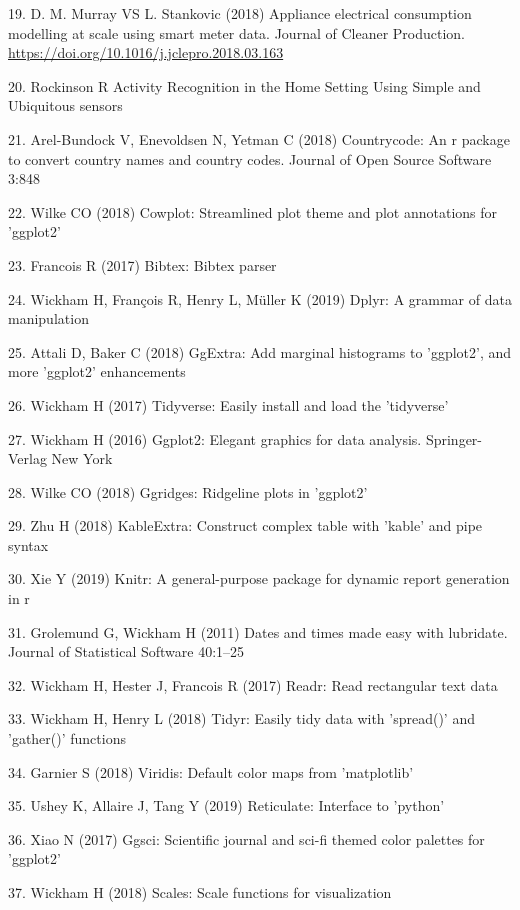 \documentclass[11pt,]{article}
\begin{document}
\leavevmode\hypertarget{ref-d.m.murrayApplianceElectricalConsumption2018}{}%
19. D. M. Murray VS L. Stankovic (2018) Appliance electrical consumption
modelling at scale using smart meter data. Journal of Cleaner
Production. \url{https://doi.org/10.1016/j.jclepro.2018.03.163}

\leavevmode\hypertarget{ref-rockinsonActivityRecognitionHome}{}%
20. Rockinson R Activity Recognition in the Home Setting Using Simple
and Ubiquitous sensors

\leavevmode\hypertarget{ref-countrycode}{}%
21. Arel-Bundock V, Enevoldsen N, Yetman C (2018) Countrycode: An r
package to convert country names and country codes. Journal of Open
Source Software 3:848

\leavevmode\hypertarget{ref-cowplot}{}%
22. Wilke CO (2018) Cowplot: Streamlined plot theme and plot annotations
for 'ggplot2'

\leavevmode\hypertarget{ref-bibtex}{}%
23. Francois R (2017) Bibtex: Bibtex parser

\leavevmode\hypertarget{ref-dplyr}{}%
24. Wickham H, François R, Henry L, Müller K (2019) Dplyr: A grammar of
data manipulation

\leavevmode\hypertarget{ref-ggExtra}{}%
25. Attali D, Baker C (2018) GgExtra: Add marginal histograms to
'ggplot2', and more 'ggplot2' enhancements

\leavevmode\hypertarget{ref-tidyverse}{}%
26. Wickham H (2017) Tidyverse: Easily install and load the 'tidyverse'

\leavevmode\hypertarget{ref-ggplot2}{}%
27. Wickham H (2016) Ggplot2: Elegant graphics for data analysis.
Springer-Verlag New York

\leavevmode\hypertarget{ref-ggridges}{}%
28. Wilke CO (2018) Ggridges: Ridgeline plots in 'ggplot2'

\leavevmode\hypertarget{ref-kableExtra}{}%
29. Zhu H (2018) KableExtra: Construct complex table with 'kable' and
pipe syntax

\leavevmode\hypertarget{ref-knitr1}{}%
30. Xie Y (2019) Knitr: A general-purpose package for dynamic report
generation in r

\leavevmode\hypertarget{ref-lubridate}{}%
31. Grolemund G, Wickham H (2011) Dates and times made easy with
lubridate. Journal of Statistical Software 40:1--25

\leavevmode\hypertarget{ref-readr}{}%
32. Wickham H, Hester J, Francois R (2017) Readr: Read rectangular text
data

\leavevmode\hypertarget{ref-tidyr}{}%
33. Wickham H, Henry L (2018) Tidyr: Easily tidy data with 'spread()'
and 'gather()' functions

\leavevmode\hypertarget{ref-viridis}{}%
34. Garnier S (2018) Viridis: Default color maps from 'matplotlib'

\leavevmode\hypertarget{ref-reticulate}{}%
35. Ushey K, Allaire J, Tang Y (2019) Reticulate: Interface to 'python'

\leavevmode\hypertarget{ref-ggsci}{}%
36. Xiao N (2017) Ggsci: Scientific journal and sci-fi themed color
palettes for 'ggplot2'

\leavevmode\hypertarget{ref-scales}{}%
37. Wickham H (2018) Scales: Scale functions for visualization
\end{document}
